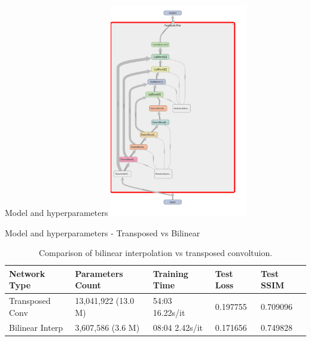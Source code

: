 \documentclass[8pt]{beamer}
\begin{document}
    \begin{frame}{Model and hyperparameters}
    \centering
    \includegraphics[width=0.45\textwidth]{images/unet_experiment_graph.png}
\end{frame}

\begin{frame}{Model and hyperparameters - Transposed vs Bilinear}
    \begin{table}[h]
        \centering
        \begin{tabular}{|l|l|l|l|l|}
        \hline
        \textbf{Network Type} & \textbf{Parameters Count} & \textbf{Training Time} & \textbf{Test Loss} & \textbf{Test SSIM} \\
        \hline
        Transposed Conv & 13,041,922 (13.0 M) & 54:03 16.22s/it & 0.197755 & 0.709096 \\
        Bilinear Interp & 3,607,586 (3.6 M) & 08:04 2.42s/it & 0.171656 & 0.749828 \\
        \hline
        \end{tabular}
        \caption{Comparison of bilinear interpolation vs transposed convoltuion.}
        \label{tab:network_comparison}
    \end{table}
\end{frame}
\end{document}
